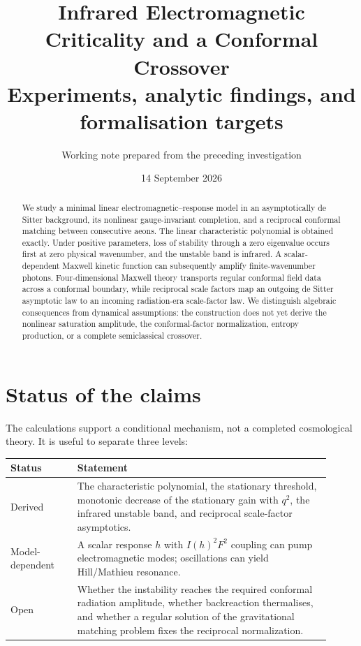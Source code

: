 \documentclass[11pt]{article}
\title{\textbf{Infrared Electromagnetic Criticality and a Conformal Crossover}\\[4pt]
\large Experiments, analytic findings, and formalisation targets}
\author{Working note prepared from the preceding investigation}
\date{14 September 2026}
\begin{document}
\maketitle

\begin{abstract}
We study a minimal linear electromagnetic--response model in an asymptotically de Sitter background, its nonlinear gauge-invariant completion, and a reciprocal conformal matching between consecutive aeons.  The linear characteristic polynomial is obtained exactly.  Under positive parameters, loss of stability through a zero eigenvalue occurs first at zero physical wavenumber, and the unstable band is infrared.  A scalar-dependent Maxwell kinetic function can subsequently amplify finite-wavenumber photons.  Four-dimensional Maxwell theory transports regular conformal field data across a conformal boundary, while reciprocal scale factors map an outgoing de Sitter asymptotic law to an incoming radiation-era scale-factor law.  We distinguish algebraic consequences from dynamical assumptions: the construction does not yet derive the nonlinear saturation amplitude, the conformal-factor normalization, entropy production, or a complete semiclassical crossover.
\end{abstract}

\section{Status of the claims}

The calculations support a conditional mechanism, not a completed cosmological theory.  It is useful to separate three levels:
\begin{center}
\begin{tabular}{@{}p{0.19\linewidth}p{0.72\linewidth}@{}}
\toprule
\textbf{Status} & \textbf{Statement}\\
\midrule
Derived & The characteristic polynomial, the stationary threshold, monotonic decrease of the stationary gain with $q^2$, the infrared unstable band, and reciprocal scale-factor asymptotics.\\
Model-dependent & A scalar response $h$ with $I(h)^2F^2$ coupling can pump electromagnetic modes; oscillations can yield Hill/Mathieu resonance.\\
Open & Whether the instability reaches the required conformal radiation amplitude, whether backreaction thermalises, and whether a regular solution of the gravitational matching problem fixes the reciprocal normalization.\\
\bottomrule
\end{tabular}
\end{center}
\end{document}

